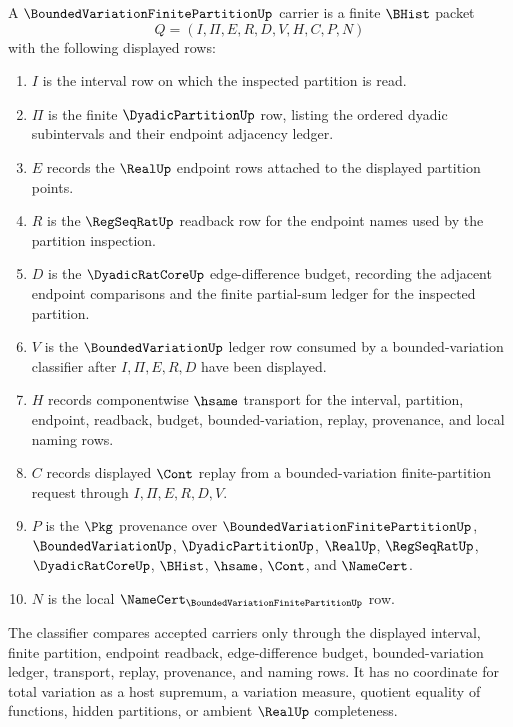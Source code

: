 \begin{definition}
\label{def:bounded-variation-finite-partition-carrier}
A $\BoundedVariationFinitePartitionUp$ carrier is a finite $\BHist$ packet
$$
Q=(I,\Pi,E,R,D,V,H,C,P,N)
$$
with the following displayed rows:
\begin{enumerate}
\item $I$ is the interval row on which the inspected partition is read.
\item $\Pi$ is the finite $\DyadicPartitionUp$ row, listing the ordered dyadic subintervals and their endpoint adjacency ledger.
\item $E$ records the $\RealUp$ endpoint rows attached to the displayed partition points.
\item $R$ is the $\RegSeqRatUp$ readback row for the endpoint names used by the partition inspection.
\item $D$ is the $\DyadicRatCoreUp$ edge-difference budget, recording the adjacent endpoint comparisons and the finite partial-sum ledger for the inspected partition.
\item $V$ is the $\BoundedVariationUp$ ledger row consumed by a bounded-variation classifier after $I,\Pi,E,R,D$ have been displayed.
\item $H$ records componentwise $\hsame$ transport for the interval, partition, endpoint, readback, budget, bounded-variation, replay, provenance, and local naming rows.
\item $C$ records displayed $\Cont$ replay from a bounded-variation finite-partition request through $I,\Pi,E,R,D,V$.
\item $P$ is the $\Pkg$ provenance over $\BoundedVariationFinitePartitionUp$, $\BoundedVariationUp$, $\DyadicPartitionUp$, $\RealUp$, $\RegSeqRatUp$, $\DyadicRatCoreUp$, $\BHist$, $\hsame$, $\Cont$, and $\NameCert$.
\item $N$ is the local $\NameCert_{\BoundedVariationFinitePartitionUp}$ row.
\end{enumerate}
The classifier compares accepted carriers only through the displayed interval, finite partition, endpoint readback, edge-difference budget, bounded-variation ledger, transport, replay, provenance, and naming rows. It has no coordinate for total variation as a host supremum, a variation measure, quotient equality of functions, hidden partitions, or ambient $\RealUp$ completeness.
\end{definition}

